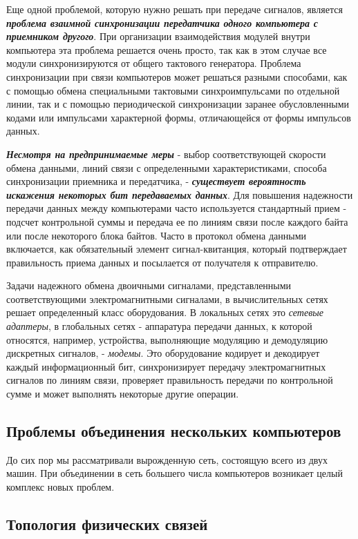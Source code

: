Еще одной проблемой, которую нужно решать при передаче сигналов, является \textbf{\textit{проблема взаимной синхронизации передатчика одного компьютера с приемником другого}}.
При организации взаимодействия модулей внутри компьютера эта проблема решается очень просто, так как в этом случае все модули синхронизируются от общего тактового генератора.
Проблема синхронизации при связи компьютеров может решаться разными способами, как с помощью обмена специальными тактовыми синхроимпульсами по отдельной линии, так и с помощью периодической синхронизации заранее обусловленными кодами или импульсами характерной формы, отличающейся от формы импульсов данных.

\textbf{\textit{Несмотря на предпринимаемые меры}} - выбор соответствующей скорости обмена данными, линий связи с определенными характеристиками, способа синхронизации приемника и передатчика, - \textbf{\textit{существует вероятность искажения некоторых бит передаваемых данных}}.
Для повышения надежности передачи данных между компьютерами часто используется стандартный прием - подсчет контрольной суммы и передача ее по линиям связи после каждого байта или после некоторого блока байтов.
Часто в протокол обмена данными включается, как обязательный элемент сигнал-квитанция, который подтверждает правильность приема данных и посылается от получателя к отправителю.

Задачи надежного обмена двоичными сигналами, представленными соответствующими электромагнитными сигналами, в вычислительных сетях решает определенный класс оборудования.
В локальных сетях это \emph{сетевые адаптеры}, в глобальных сетях - аппаратура передачи данных, к которой относятся, например, устройства, выполняющие модуляцию и демодуляцию дискретных сигналов, - \emph{модемы}.
Это оборудование кодирует и декодирует каждый информационный бит, синхронизирует передачу электромагнитных сигналов по линиям связи, проверяет правильность передачи по контрольной сумме и может выполнять некоторые другие операции.

\subsection{Проблемы объединения нескольких компьютеров}

До сих пор мы рассматривали вырожденную сеть, состоящую всего из двух машин.
При объединении в сеть большего числа компьютеров возникает целый комплекс новых проблем.

\subsection{Топология физических связей}


